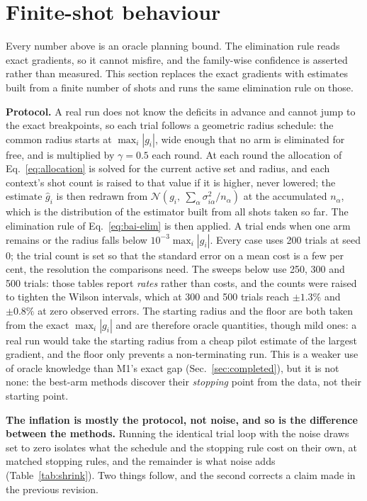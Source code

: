 \documentclass[10pt]{article}
\begin{document}
\section{Finite-shot behaviour}
\label{sec:finite-shot}

Every number above is an oracle planning bound. The elimination rule reads exact
gradients, so it cannot misfire, and the family-wise confidence is asserted rather
than measured. This section replaces the exact gradients with estimates built from
a finite number of shots and runs the same elimination rule on those.

\textbf{Protocol.} A real run does not know the deficits in advance and cannot
jump to the exact breakpoints, so each trial follows a geometric radius schedule:
the common radius starts at $\max_i|g_i|$, wide enough that no arm is eliminated
for free, and is multiplied by $\gamma=0.5$ each round. At each round the
allocation of Eq.~\eqref{eq:allocation} is solved for the current active set and
radius, and each context's shot count is raised to that value if it is higher,
never lowered; the estimate $\widehat g_i$ is then redrawn from
$\mathcal N\!\left(g_i,\ \sum_\alpha\sigma_{i\alpha}^2/n_\alpha\right)$ at the
accumulated $n_\alpha$, which is the distribution of the estimator built from all
shots taken so far. The elimination rule of Eq.~\eqref{eq:bai-elim} is then
applied. A trial ends when one arm remains or the radius falls below
$10^{-3}\max_i|g_i|$. Every case uses 200 trials at seed $0$; the trial count is
set so that the standard error on a mean cost is a few per cent, the resolution
the comparisons need. The sweeps below use 250, 300 and 500 trials: those tables
report \emph{rates} rather than costs, and the counts were raised to tighten the
Wilson intervals, which at 300 and 500 trials reach $\pm1.3\%$ and $\pm0.8\%$ at
zero observed errors. The starting radius and the floor are both taken
from the exact $\max_i|g_i|$ and are therefore oracle quantities, though mild ones:
a real run would take the starting radius from a cheap pilot estimate of the
largest gradient, and the floor only prevents a non-terminating run. This is a
weaker use of oracle knowledge than M1's exact gap (Sec.~\ref{sec:completed}),
but it is not none: the best-arm methods discover their \emph{stopping} point
from the data, not their starting point.

\textbf{The inflation is mostly the protocol, not noise, and so is the difference
between the methods.} Running the identical trial loop with the noise draws set to
zero isolates what the schedule and the stopping rule cost on their own, at
matched stopping rules, and the remainder is what noise adds
(Table~\ref{tab:shrink}). Two things follow, and the second corrects a claim made
in the previous revision.
\end{document}

